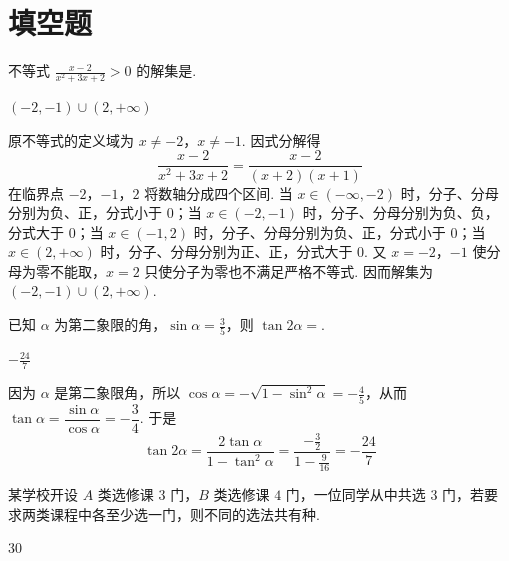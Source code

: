 \section{填空题}

\begin{problem}
不等式 \(\frac{x - 2}{x^2 + 3x + 2} > 0\) 的解集是\fillinblank{}.
\end{problem}

\begin{answer}
\(\left(-2,-1\right)\cup\left(2,+\infty\right)\)
\end{answer}

\begin{solution}
原不等式的定义域为 \(x\ne-2\)，\(x\ne-1\). 因式分解得
\[
\frac{x-2}{x^2+3x+2}=\frac{x-2}{(x+2)(x+1)}
\]
在临界点 \(-2\)，\(-1\)，\(2\) 将数轴分成四个区间. 当 \(x\in(-\infty,-2)\) 时，分子、分母分别为负、正，分式小于 \(0\)；当 \(x\in(-2,-1)\) 时，分子、分母分别为负、负，分式大于 \(0\)；当 \(x\in(-1,2)\) 时，分子、分母分别为负、正，分式小于 \(0\)；当 \(x\in(2,+\infty)\) 时，分子、分母分别为正、正，分式大于 \(0\). 又 \(x=-2\)，\(-1\) 使分母为零不能取，\(x=2\) 只使分子为零也不满足严格不等式. 因而解集为
\(\left(-2,-1\right)\cup\left(2,+\infty\right)\).
\end{solution}

\begin{problem}
已知 \(\alpha\) 为第二象限的角，\(\sin \alpha = \frac{3}{5}\)，则 \(\tan 2\alpha =\)\fillinblank{}.
\end{problem}

\begin{answer}
\(-\frac{24}{7}\)
\end{answer}

\begin{solution}
因为 \(\alpha\) 是第二象限角，所以
\(\cos\alpha=-\sqrt{1-\sin^2\alpha}=-\frac45\)，从而
\(\tan\alpha=\dfrac{\sin\alpha}{\cos\alpha}=-\dfrac34\).
于是
\[
\tan2\alpha=\frac{2\tan\alpha}{1-\tan^2\alpha}
=\frac{-\frac32}{1-\frac9{16}}
=-\frac{24}{7}
\]
\end{solution}

\begin{problem}
某学校开设 \(A\) 类选修课 \(3\text{ 门}\)，\(B\) 类选修课 \(4\text{ 门}\)，一位同学从中共选 \(3\text{ 门}\)，若要求两类课程中各至少选一门，则不同的选法共有\fillinblank{}\(\text{种}\).
\end{problem}

\begin{answer}
30
\end{answer}

